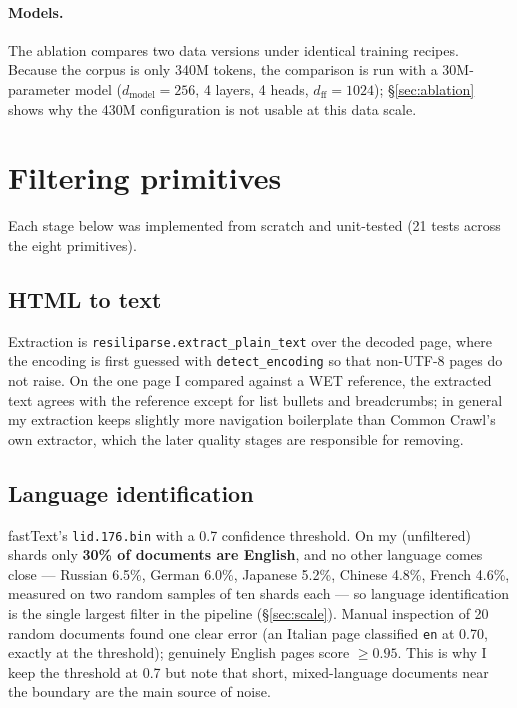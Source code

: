 \documentclass{article}
\begin{document}
\paragraph{Models.}
The ablation compares two data versions under identical training recipes. Because the corpus
is only 340M tokens, the comparison is run with a 30M-parameter model ($d_\text{model}=256$,
4 layers, 4 heads, $d_\text{ff}=1024$); §\ref{sec:ablation} shows why the 430M
configuration is not usable at this data scale.

\section{Filtering primitives}
\label{sec:primitives}

Each stage below was implemented from scratch and unit-tested (21 tests across the eight
primitives).

\subsection{HTML to text}
Extraction is \texttt{resiliparse.extract\_plain\_text} over the decoded page, where the
encoding is first guessed with \texttt{detect\_encoding} so that non-UTF-8 pages do not raise.
On the one page I compared against a WET reference, the extracted
text agrees with the reference except for list bullets and breadcrumbs; in general my
extraction keeps slightly more navigation boilerplate than Common Crawl's own extractor, which
the later quality stages are responsible for removing.

\subsection{Language identification}
fastText's \texttt{lid.176.bin} with a 0.7 confidence threshold. On my (unfiltered) shards
only \textbf{30\% of documents are English}, and no other language comes close --- Russian
6.5\%, German 6.0\%, Japanese 5.2\%, Chinese 4.8\%, French 4.6\%, measured on two random samples
of ten shards each --- so language identification is the single largest filter in the pipeline
(§\ref{sec:scale}). Manual inspection of 20 random documents found one clear error (an Italian
page classified \texttt{en} at 0.70, exactly at the threshold); genuinely English pages score
$\geq 0.95$. This is why I keep the threshold at 0.7 but note that short, mixed-language
documents near the boundary are the main source of noise.
\end{document}
